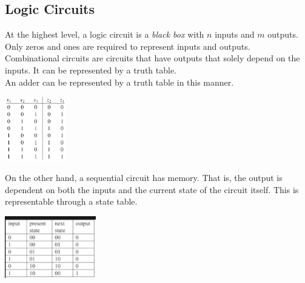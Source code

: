 \documentclass[nobib]{tufte-handout}
\begin{document}
\subsection{Logic Circuits}
At the highest level, a logic circuit is a \textit{black box} with $n$ inputs
and $m$ outputs. Only zeros and ones are required to represent inputs and
outputs. \\ Combinational circuits are circuits that have outputs that solely
depend on the inputs. It can be represented by a truth table.\\ An adder can be
represented by a truth table in this manner.
\begin{center}
    \includegraphics[width= 100px]{images/Screenshot 2024-01-10 144557.png}
\end{center}
On the other hand, a sequential circuit has memory. That is, the output is dependent on both the inputs and the current state of the circuit itself. This is representable through a state table.\\
\begin{center}
    \includegraphics[width= 150px]{images/state table.png}
\end{center}
\end{document}

